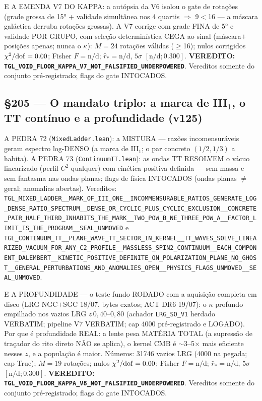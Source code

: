 \documentclass[11pt]{article}
\theoremstyle{definition}\newtheorem{deriv}{Derivação}
\begin{document}
E A EMENDA V7 DO KAPPA: a autópsia da V6 isolou o gate de rotações (grade grossa de 15° + validade simultânea nos 4 quartis $\Rightarrow$ 9$<$16 --- a máscara galáctica derruba rotações grossas). A V7 corrige com grade FINA de 5° e validade POR GRUPO, com seleção determinística CEGA ao sinal (máscara$+$posições apenas; nunca o $\kappa$): $M=24$ rotações válidas ($\geq$16); nulos corrigidos $\chi^2/{\rm dof}=0.00$; Fisher $F=\text{n/d}$; $\hat r_*=\text{n/d}$, $5\sigma$ $[\text{n/d};0.300]$. \textbf{VEREDITO: \texttt{TGL\_VOID\_FLOOR\_KAPPA\_V7\_NOT\_FALSIFIED\_UNDERPOWERED}}. Vereditos somente do conjunto pré-registrado; flags do gate INTOCADOS.

\subsection*{\S205 --- O mandato triplo: a marca de III$_1$, o TT contínuo e a profundidade (v125)}A PEDRA 72 (\texttt{MixedLadder.lean}): a MISTURA — razões incomensuráveis geram espectro log-DENSO (a marca de III$_1$; o par concreto $(1/2,1/3)$ a habita). A PEDRA 73 (\texttt{ContinuumTT.lean}): as ondas TT RESOLVEM o vácuo linearizado (perfil $C^2$ qualquer) com cinética positiva-definida — sem massa e sem fantasma nas ondas planas; flags de física INTOCADOS (ondas planas $\neq$ geral; anomalias abertas). Vereditos: \texttt{TGL\_MIXED\_LADDER\_\_MARK\_OF\_III\_ONE\_\_INCOMMENSURABLE\_RATIOS\_GENERATE\_LOG\_DENSE\_RATIO\_SPECTRUM\_\_DENSE\_OR\_CYCLIC\_PLUS\_CYCLIC\_EXCLUSION\_\_CONCRETE\_PAIR\_HALF\_THIRD\_INHABITS\_THE\_MARK\_\_TWO\_POW\_B\_NE\_THREE\_POW\_A\_\_FACTOR\_LIMIT\_IS\_THE\_PROGRAM\_\_SEAL\_UNMOVED} e \texttt{TGL\_CONTINUUM\_TT\_\_PLANE\_WAVE\_TT\_SECTOR\_IN\_KERNEL\_\_TT\_WAVES\_SOLVE\_LINEARIZED\_VACUUM\_FOR\_ANY\_C2\_PROFILE\_\_MASSLESS\_SPIN2\_CONTINUUM\_\_EACH\_COMPONENT\_DALEMBERT\_\_KINETIC\_POSITIVE\_DEFINITE\_ON\_POLARIZATION\_PLANE\_NO\_GHOST\_\_GENERAL\_PERTURBATIONS\_AND\_ANOMALIES\_OPEN\_\_PHYSICS\_FLAGS\_UNMOVED\_\_SEAL\_UNMOVED}.

E A PROFUNDIDADE — o teste fundo RODADO com a aquisição completa em disco (LRG NGC$+$SGC 18/07, bytes exatos; ACT DR6 19/07): o $\kappa$ profundo empilhado nos vazios LRG $z\,0{,}40$--$0{,}80$ (achador \texttt{LRG\_SO\_V1} herdado VERBATIM; pipeline V7 VERBATIM; cap 4000 pré-registrado e LOGADO). Por que é profundidade REAL: a lente pesa MATÉRIA TOTAL (a supressão de traçador do rito direto NÃO se aplica), o kernel CMB é $\sim$3--5$\times$ mais eficiente nesses $z$, e a população é maior. Números: 31746 vazios LRG (4000 na pegada; cap True); $M=19$ rotações; nulos $\chi^2/{\rm dof}=0.00$; Fisher $F=\text{n/d}$; $\hat r_*=\text{n/d}$, $5\sigma$ $[\text{n/d};0.300]$. \textbf{VEREDITO: \texttt{TGL\_VOID\_FLOOR\_KAPPA\_V8\_NOT\_FALSIFIED\_UNDERPOWERED}}. Vereditos somente do conjunto pré-registrado; flags do gate INTOCADOS.
\end{document}
